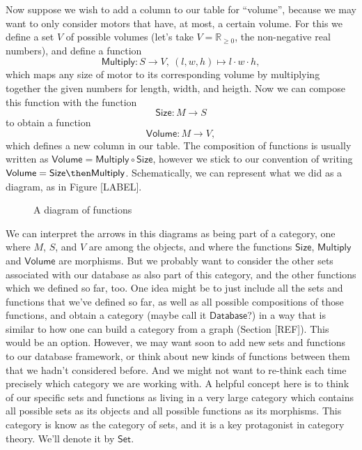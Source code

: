 Now suppose we wish to add a column to our table for ``volume'', because we may want to only consider motors that have, at most, a certain volume. For this we define a set $V$ of possible volumes (let's take $V = \mathbb{R}_{\geq 0}$, the non-negative real numbers), and define a function 
$$
\mathsf{Multiply}: S \longrightarrow V, \ (l, w, h) \longmapsto l \cdot w \cdot h,
$$
which maps any size of motor to its corresponding volume by multiplying together the given numbers for length, width, and heigth.  Now we can compose this function with the function
$$
\mathsf{Size}: M \longrightarrow S
$$
to obtain a function 
$$
\mathsf{Volume}: M \longrightarrow V,
$$
which defines a new column in our table. The composition of functions is usually written as $\mathsf{Volume} = \mathsf{Multiply} \circ \mathsf{Size}$, however we stick to our convention of writing $\mathsf{Volume} = \mathsf{Size} \then \mathsf{Multiply}$. Schematically, we can represent what we did as a diagram, as in Figure [LABEL].



\begin{figure}[h!]
\begin{center}
\end{center}
\caption{A diagram of functions \label{fig:intermodal}}
\end{figure}

We can interpret the arrows in this diagrams as being part of a category, one where $M$, $S$, and $V$ are among the objects, and where the functions $\mathsf{Size}$, $\mathsf{Multiply}$ and $\mathsf{Volume}$ are morphisms. But we probably want to consider the other sets associated with our database as also part of this category, and the other functions which we defined so far, too. One idea might be to just include all the sets and functions that we've defined so far, as well as all possible compositions of those functions, and obtain a category (maybe call it $\mathsf{Database}$?) in a way that is similar to how one can build a category from a graph (Section [REF]). This would be an option. However, we may want soon to add new sets and functions to our database framework, or think about new kinds of functions between them that we hadn't considered before. And we might not want to re-think each time precisely which category we are working with. A helpful concept here is to think of our specific sets and functions as living in a very large category which contains all possible sets as its objects and all possible functions as its morphisms. This category is know as the category of sets, and it is a key protagonist in category theory. We'll denote it by $\mathsf{Set}$. 

